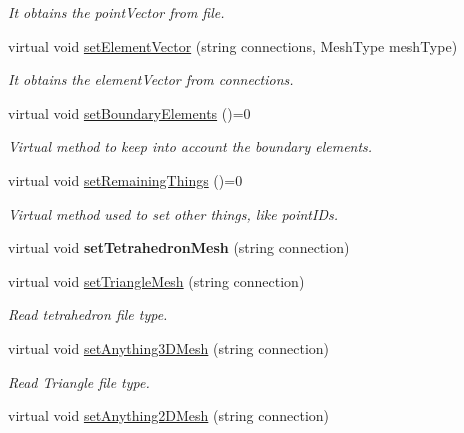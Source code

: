 \begin{DoxyCompactItemize}
\begin{DoxyCompactList}\small\item\em \-It obtains the point\-Vector from file. \end{DoxyCompactList}\item 
virtual void \hyperlink{class_mesh_af6e1d08bb6a3d3a69a5ca363f8545442}{set\-Element\-Vector} (string connections, \-Mesh\-Type mesh\-Type)
\begin{DoxyCompactList}\small\item\em \-It obtains the element\-Vector from connections. \end{DoxyCompactList}\item 
virtual void \hyperlink{class_mesh_a887eb0d187f2da37b4c785d68dfcf7ad}{set\-Boundary\-Elements} ()=0
\begin{DoxyCompactList}\small\item\em \-Virtual method to keep into account the boundary elements. \end{DoxyCompactList}\item 
virtual void \hyperlink{class_mesh_a70d7cba1e66435915fb1db7c430aa44f}{set\-Remaining\-Things} ()=0
\begin{DoxyCompactList}\small\item\em \-Virtual method used to set other things, like point\-I\-Ds. \end{DoxyCompactList}\item 
\hypertarget{class_mesh_a55b0d4231dea5fce30cfe45a0a0c65f0}{virtual void {\bfseries set\-Tetrahedron\-Mesh} (string connection)}\label{class_mesh_a55b0d4231dea5fce30cfe45a0a0c65f0}

\item 
\hypertarget{class_mesh_aa06732e9d97c6753e880edda677b21b5}{virtual void \hyperlink{class_mesh_aa06732e9d97c6753e880edda677b21b5}{set\-Triangle\-Mesh} (string connection)}\label{class_mesh_aa06732e9d97c6753e880edda677b21b5}

\begin{DoxyCompactList}\small\item\em \-Read tetrahedron file type. \end{DoxyCompactList}\item 
\hypertarget{class_mesh_ae066f4f10aaaaa6d49f581dde9721c8a}{virtual void \hyperlink{class_mesh_ae066f4f10aaaaa6d49f581dde9721c8a}{set\-Anything3\-D\-Mesh} (string connection)}\label{class_mesh_ae066f4f10aaaaa6d49f581dde9721c8a}

\begin{DoxyCompactList}\small\item\em \-Read \-Triangle file type. \end{DoxyCompactList}\item 
\hypertarget{class_mesh_a2ecf67041cd4170bbe58e150c0463f22}{virtual void \hyperlink{class_mesh_a2ecf67041cd4170bbe58e150c0463f22}{set\-Anything2\-D\-Mesh} (string connection)}\label{class_mesh_a2ecf67041cd4170bbe58e150c0463f22}


\end{DoxyCompactItemize}
